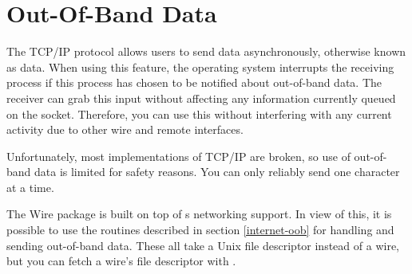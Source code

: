 \section{Out-Of-Band Data}

The TCP/IP protocol allows users to send data asynchronously, otherwise
known as  data.  When using this feature, the operating
system interrupts the receiving process if this process has chosen to be
notified about out-of-band data.  The receiver can grab this input
without affecting any information currently queued on the socket.
Therefore, you can use this without interfering with any current
activity due to other wire and remote interfaces.

Unfortunately, most implementations of TCP/IP are broken, so use of
out-of-band data is limited for safety reasons.  You can only reliably
send one character at a time.

The Wire package is built on top of \cmucl{}s networking support. In
view of this, it is possible to use the routines described in section
\ref{internet-oob} for handling and sending out-of-band data. These
all take a Unix file descriptor instead of a wire, but you can fetch a
wire's file descriptor with .
